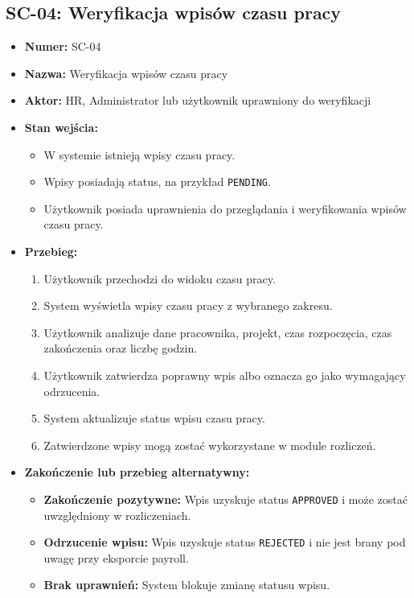 \subsection{SC-04: Weryfikacja wpisów czasu pracy}
\begin{itemize}
    \item \textbf{Numer:} SC-04
    \item \textbf{Nazwa:} Weryfikacja wpisów czasu pracy
    \item \textbf{Aktor:} HR, Administrator lub użytkownik uprawniony do weryfikacji
    \item \textbf{Stan wejścia:}
    \begin{itemize}
        \item W systemie istnieją wpisy czasu pracy.
        \item Wpisy posiadają status, na przykład \texttt{PENDING}.
        \item Użytkownik posiada uprawnienia do przeglądania i weryfikowania wpisów czasu pracy.
    \end{itemize}
    \item \textbf{Przebieg:}
    \begin{enumerate}
        \item Użytkownik przechodzi do widoku czasu pracy.
        \item System wyświetla wpisy czasu pracy z wybranego zakresu.
        \item Użytkownik analizuje dane pracownika, projekt, czas rozpoczęcia, czas zakończenia oraz liczbę godzin.
        \item Użytkownik zatwierdza poprawny wpis albo oznacza go jako wymagający odrzucenia.
        \item System aktualizuje status wpisu czasu pracy.
        \item Zatwierdzone wpisy mogą zostać wykorzystane w module rozliczeń.
    \end{enumerate}
    \item \textbf{Zakończenie lub przebieg alternatywny:}
    \begin{itemize}
        \item \textbf{Zakończenie pozytywne:} Wpis uzyskuje status \texttt{APPROVED} i może zostać uwzględniony w rozliczeniach.
        \item \textbf{Odrzucenie wpisu:} Wpis uzyskuje status \texttt{REJECTED} i nie jest brany pod uwagę przy eksporcie payroll.
        \item \textbf{Brak uprawnień:} System blokuje zmianę statusu wpisu.
    \end{itemize}
\end{itemize}


